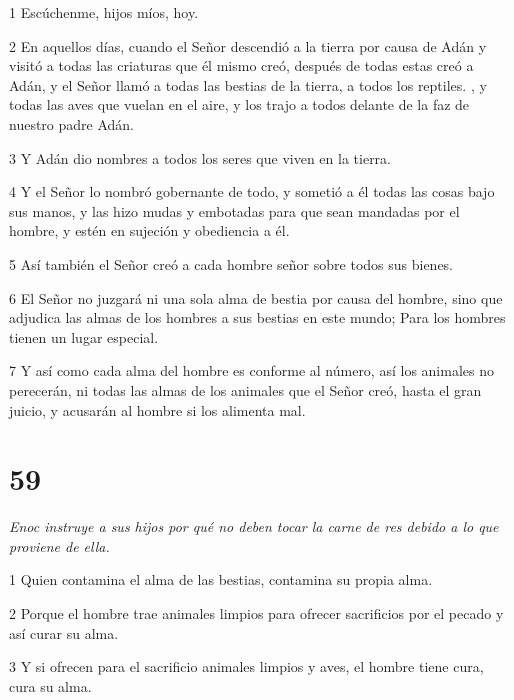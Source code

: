 \par 1 Escúchenme, hijos míos, hoy.

\par 2 En aquellos días, cuando el Señor descendió a la tierra por causa de Adán y visitó a todas las criaturas que él mismo creó, después de todas estas creó a Adán, y el Señor llamó a todas las bestias de la tierra, a todos los reptiles. , y todas las aves que vuelan en el aire, y los trajo a todos delante de la faz de nuestro padre Adán.

\par 3 Y Adán dio nombres a todos los seres que viven en la tierra.

\par 4 Y el Señor lo nombró gobernante de todo, y sometió a él todas las cosas bajo sus manos, y las hizo mudas y embotadas para que sean mandadas por el hombre, y estén en sujeción y obediencia a él.

\par 5 Así también el Señor creó a cada hombre señor sobre todos sus bienes.

\par 6 El Señor no juzgará ni una sola alma de bestia por causa del hombre, sino que adjudica las almas de los hombres a sus bestias en este mundo; Para los hombres tienen un lugar especial.

\par 7 Y así como cada alma del hombre es conforme al número, así los animales no perecerán, ni todas las almas de los animales que el Señor creó, hasta el gran juicio, y acusarán al hombre si los alimenta mal.

\chapter{59}

\par \textit{Enoc instruye a sus hijos por qué no deben tocar la carne de res debido a lo que proviene de ella.}

\par 1 Quien contamina el alma de las bestias, contamina su propia alma.

\par 2 Porque el hombre trae animales limpios para ofrecer sacrificios por el pecado y así curar su alma.

\par 3 Y si ofrecen para el sacrificio animales limpios y aves, el hombre tiene cura, cura su alma.

